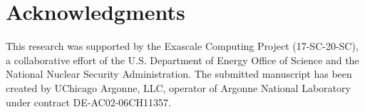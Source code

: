 \documentclass{anstrans}
\begin{document}
\section{Acknowledgments}

This research was supported by the Exascale Computing Project (17-SC-20-SC), a
collaborative effort of the U.S. Department of Energy Office of Science and the
National Nuclear Security Administration. The submitted manuscript has been
created by UChicago Argonne, LLC, operator of Argonne National Laboratory under
contract DE-AC02-06CH11357.



\end{document}
